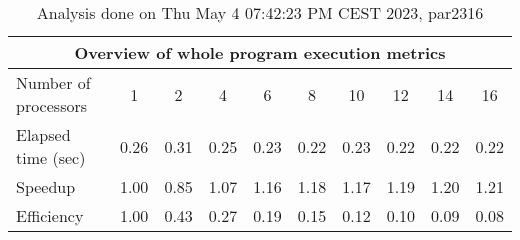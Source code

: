 \begin{table}[h]
\begin{center}
\begin{tabular}{|l|c|c|c|c|c|c|c|c|c|}
\hline
\multicolumn{10}{|c|}{Overview of whole program execution metrics} \\
\hline
\hline
Number of processors & 1 & 2 & 4 & 6 & 8 & 10 & 12 & 14 & 16 \\
\hline
Elapsed time (sec)      &       0.26 &       0.31 &       0.25 &       0.23 &       0.22 &       0.23 &       0.22 &       0.22 &       0.22 \\
\hline
Speedup                 &       1.00 &       0.85 &       1.07 &       1.16 &       1.18 &       1.17 &       1.19 &       1.20 &       1.21 \\
\hline
Efficiency              &       1.00 &       0.43 &       0.27 &       0.19 &       0.15 &       0.12 &       0.10 &       0.09 &       0.08 \\
\hline
\end{tabular}
\end{center}
\caption{ Analysis done on Thu May  4 07:42:23 PM CEST 2023, par2316}
\end{table}
